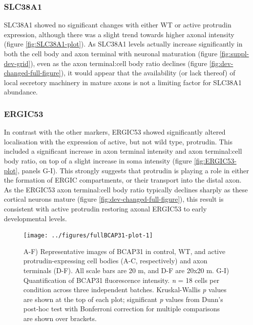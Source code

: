 \documentclass[
  12pt,
  a4paper,
]{book}
\begin{document}
\subsubsection{SLC38A1}\label{slc38a1}

SLC38A1 showed no significant changes with either WT or active protrudin expression, although there was a slight trend towards higher axonal intensity (figure \ref{fig:SLC38A1-plot}). As SLC38A1 levels actually increase significantly in both the cell body and axon terminal with neuronal maturation (figure \ref{fig:suppl-dev-grid}), even as the axon terminal:cell body ratio declines (figure \ref{fig:dev-changed-full-figure}), it would appear that the availability (or lack thereof) of local secretory machinery in mature axons is not a limiting factor for SLC38A1 abundance.

\subsubsection{ERGIC53}\label{ergic53}

In contrast with the other markers, ERGIC53 showed significantly altered localisation with the expression of active, but not wild type, protrudin. This included a significant increase in axon terminal intensity and axon terminal:cell body ratio, on top of a slight increase in soma intensity (figure \ref{fig:ERGIC53-plot}, panels G-I). This strongly suggests that protrudin is playing a role in either the formation of ERGIC compartments, or their transport into the distal axon. As the ERGIC53 axon terminal:cell body ratio typically declines sharply as these cortical neurons mature (figure \ref{fig:dev-changed-full-figure}), this result is consistent with active protrudin restoring axonal ERGIC53 to early developmental levels.



\begin{figure}[H]
\texttt{[image: ../figures/fullBCAP31-plot-1]} \caption[BCAP31 localisation in protrudin-expressing neurons]{A-F) Representative images of BCAP31 in control, WT, and active protrudin-expressing cell bodies (A-C, respectively) and axon terminals (D-F). All scale bars are 20 \textmu{}m, and D-F are 20x20 \textmu{}m. G-I) Quantification of BCAP31 fluorescence intensity. \emph{n} = 18 cells per condition across three independent batches. Kruskal-Wallis \emph{p} values are shown at the top of each plot; significant \emph{p} values from Dunn's post-hoc test with Bonferroni correction for multiple comparisons are shown over brackets.}\label{fig:BCAP31-plot}
\end{figure}
\end{document}
